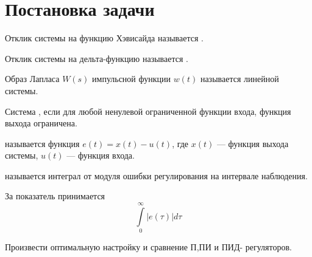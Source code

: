 \section{Постановка задачи}
\begin{definition}
	Отклик системы на функцию Хэвисайда называется .
\end{definition}

\begin{definition}
	Отклик системы на дельта-функцию называется .
\end{definition}

\begin{definition}
	Образ Лапласа $W(s)$ импульсной функции $w(t)$ называется  линейной системы.
\end{definition}

\begin{definition}
	Система , если для любой ненулевой ограниченной функции входа, функция выхода ограничена.
\end{definition}

\begin{definition}
	 называется функция $e(t) = x(t) - u(t)$, где $x(t)$ --- функция выхода системы, $u(t)$ --- функция входа.
\end{definition}

\begin{definition}
	 называется интеграл от модуля ошибки регулирования на интервале наблюдения.
\end{definition}

\begin{definition}
	За показатель  принимается
	\[\int\limits_{0}^{\infty} |e(\tau)| d \tau\]
\end{definition}

\begin{goal}
	Произвести оптимальную настройку и сравнение П,ПИ и ПИД- регуляторов.
\end{goal}

